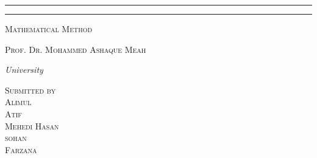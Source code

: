 \documentclass[12pt,a4paper]{article}
\newcommand{\course}{Mathematical Method}
\newcommand{\prof}{Prof. Dr. Mohammed Ashaque Meah}
\begin{document}
\begin{titlepage}
    \vspace{0.6\baselineskip}
    
    \rule{345pt}{0.4pt}\vspace*{-\baselineskip}\vspace{3.2pt}
    \rule{345pt}{1.6pt}
    
    \vspace{2\baselineskip} %
    
    
    {\scshape \Large{\course}} 
    
    \vspace*{5\baselineskip} %
    
    
    
    \vspace{0.5\baselineskip} 
    
    {\scshape   \Large \prof\\ } %
    
    \vspace{0.75\baselineskip} 
    
    {\textit{\large University}} 
    
    \vfill 
    
    \vspace{0.3\baselineskip} 
    
    
    {\scshape \large Submitted by\\  Alimul \\ Atif \\ Mehedi Hasan \\ sohan \\ Farzana } 
    \vspace*{40pt}
    \end{titlepage}
\end{document}
